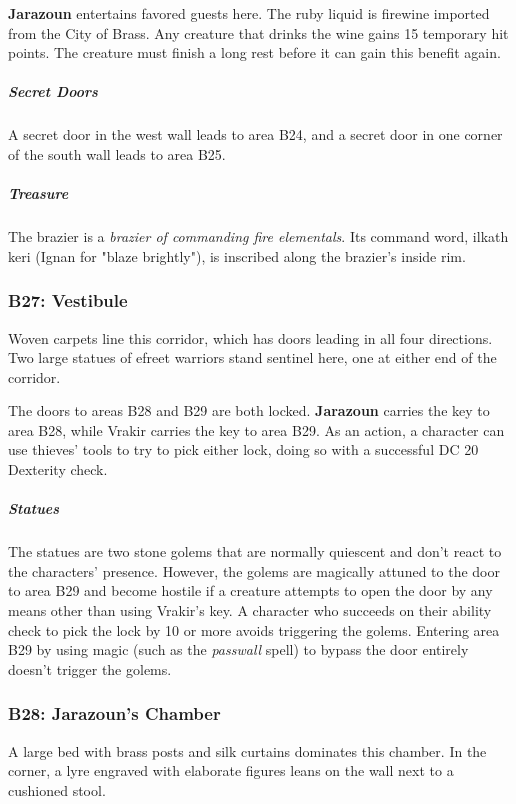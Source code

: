 \documentclass[10pt,a4paper,twoside,bg=print,twocolumn,openany,nodeprecatedcode]{dndbook}
\begin{document}
\textbf{Jarazoun} entertains favored guests here. The ruby liquid is firewine imported from the City of Brass. Any creature that drinks the wine gains 15 temporary hit points. The creature must finish a long rest before it can gain this benefit again.

\subparagraph{Secret Doors}
A secret door in the west wall leads to area B24, and a secret door in one corner of the south wall leads to area B25.

\subparagraph{Treasure}
The brazier is a \textit{brazier of commanding fire elementals}. Its command word, ilkath keri (Ignan for "blaze brightly"), is inscribed along the brazier's inside rim.

\subsubsection{B27: Vestibule}
\begin{DndReadAloud}{}
Woven carpets line this corridor, which has doors leading in all four directions. Two large statues of efreet warriors stand sentinel here, one at either end of the corridor.

\end{DndReadAloud}

The doors to areas B28 and B29 are both locked. \textbf{Jarazoun} carries the key to area B28, while Vrakir carries the key to area B29. As an action, a character can use thieves' tools to try to pick either lock, doing so with a successful DC 20 Dexterity check.

\subparagraph{Statues}
The statues are two stone golems that are normally quiescent and don't react to the characters' presence. However, the golems are magically attuned to the door to area B29 and become hostile if a creature attempts to open the door by any means other than using Vrakir's key. A character who succeeds on their ability check to pick the lock by 10 or more avoids triggering the golems. Entering area B29 by using magic (such as the \textit{passwall} spell) to bypass the door entirely doesn't trigger the golems.

\subsubsection{B28: Jarazoun's Chamber}
\begin{DndReadAloud}{}
A large bed with brass posts and silk curtains dominates this chamber. In the corner, a lyre engraved with elaborate figures leans on the wall next to a cushioned stool.

\end{DndReadAloud}
\end{document}
